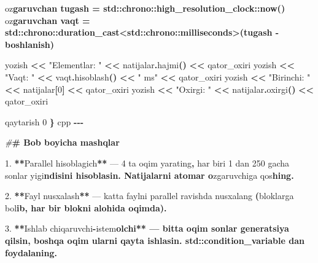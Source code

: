 \documentclass[a4paper,11pt,twoside,openright]{book}
\newenvironment{Shaded}{\begin{snugshade}}{\end{snugshade}}
\newcommand{\CharTok}[1]{\textcolor[rgb]{0.31,0.60,0.02}{#1}}
\newcommand{\DecValTok}[1]{\textcolor[rgb]{0.00,0.00,0.81}{#1}}
\newcommand{\ErrorTok}[1]{\textcolor[rgb]{0.64,0.00,0.00}{\textbf{#1}}}
\newcommand{\FloatTok}[1]{\textcolor[rgb]{0.00,0.00,0.81}{#1}}
\newcommand{\NormalTok}[1]{#1}
\newcommand{\OperatorTok}[1]{\textcolor[rgb]{0.81,0.36,0.00}{\textbf{#1}}}
\newcommand{\PreprocessorTok}[1]{\textcolor[rgb]{0.56,0.35,0.01}{\textit{#1}}}
\newcommand{\StringTok}[1]{\textcolor[rgb]{0.31,0.60,0.02}{#1}}
\begin{document}
\begin{Shaded}
\begin{Highlighting}[]
\NormalTok{    o}\CharTok{\textquotesingle{}z}\ErrorTok{garuvchan tugash = std::chrono::high\_resolution\_clock::now()}
\NormalTok{    o}\CharTok{\textquotesingle{}z}\ErrorTok{garuvchan vaqt = std::chrono::duration\_cast\textless{}std::chrono::milliseconds\textgreater{}(tugash {-} boshlanish)}

\NormalTok{    yozish }\OperatorTok{\textless{}\textless{}} \StringTok{"Elementlar: "} \OperatorTok{\textless{}\textless{}}\NormalTok{ natijalar}\OperatorTok{.}\NormalTok{hajmi}\OperatorTok{()} \OperatorTok{\textless{}\textless{}}\NormalTok{ qator\_oxiri}
\NormalTok{    yozish }\OperatorTok{\textless{}\textless{}} \StringTok{"Vaqt: "} \OperatorTok{\textless{}\textless{}}\NormalTok{ vaqt}\OperatorTok{.}\NormalTok{hisoblash}\OperatorTok{()} \OperatorTok{\textless{}\textless{}} \StringTok{" ms"} \OperatorTok{\textless{}\textless{}}\NormalTok{ qator\_oxiri}
\NormalTok{    yozish }\OperatorTok{\textless{}\textless{}} \StringTok{"Birinchi: "} \OperatorTok{\textless{}\textless{}}\NormalTok{ natijalar}\OperatorTok{[}\DecValTok{0}\OperatorTok{]} \OperatorTok{\textless{}\textless{}}\NormalTok{ qator\_oxiri}
\NormalTok{    yozish }\OperatorTok{\textless{}\textless{}} \StringTok{"Oxirgi: "} \OperatorTok{\textless{}\textless{}}\NormalTok{ natijalar}\OperatorTok{.}\NormalTok{oxirgi}\OperatorTok{()} \OperatorTok{\textless{}\textless{}}\NormalTok{ qator\_oxiri}

\NormalTok{    qaytarish }\DecValTok{0}
\OperatorTok{\}}
\ErrorTok{\textasciigrave{}\textasciigrave{}\textasciigrave{}}\NormalTok{cpp}
\OperatorTok{{-}{-}{-}}

\PreprocessorTok{\#}\ErrorTok{\# Bob bo\textquotesingle{}yicha mashqlar}

\FloatTok{1.} \OperatorTok{**}\NormalTok{Parallel hisoblagich}\OperatorTok{**}\NormalTok{ — }\DecValTok{4}\NormalTok{ ta oqim yarating}\OperatorTok{,}\NormalTok{ har biri }\DecValTok{1}\NormalTok{ dan }\DecValTok{250}\NormalTok{ gacha sonlar yig}\CharTok{\textquotesingle{}i}\ErrorTok{ndisini hisoblasin. Natijalarni atomar o}\CharTok{\textquotesingle{}}\NormalTok{zgaruvchiga qo}\CharTok{\textquotesingle{}s}\ErrorTok{hing.}

\FloatTok{2.} \OperatorTok{**}\NormalTok{Fayl nusxalash}\OperatorTok{**}\NormalTok{ — katta faylni parallel ravishda nusxalang }\OperatorTok{(}\NormalTok{bloklarga bo}\CharTok{\textquotesingle{}l}\ErrorTok{ib, har bir blokni alohida oqimda).}

\FloatTok{3.} \OperatorTok{**}\NormalTok{Ishlab chiqaruvchi}\OperatorTok{{-}}\NormalTok{iste}\CharTok{\textquotesingle{}m}\ErrorTok{olchi** — bitta oqim sonlar generatsiya qilsin, boshqa oqim ularni qayta ishlasin. \textasciigrave{}std::condition\_variable\textasciigrave{} dan foydalaning.}


\end{Highlighting}
\end{Shaded}
\end{document}
